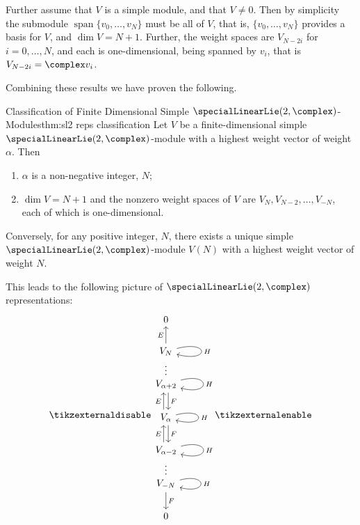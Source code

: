 \documentclass[fleqn]{NotesClass}
\DeclareMathOperator{\Span}{span}
\begin{document}
    Further assume that \(V\) is a simple module, and that \(V \ne 0\).
    Then by simplicity the submodule \(\Span\{v_0, \dotsc, v_N\}\) must be all of \(V\), that is, \(\{v_0, \dotsc, v_N\}\) provides a basis for \(V\), and \(\dim V = N + 1\).
    Further, the weight spaces are \(V_{N-2i}\) for \(i = 0, \dotsc, N\), and each is one-dimensional, being spanned by \(v_i\), that is \(V_{N - 2i} = \complex v_i\).
    
    Combining these results we have proven the following.
    
    \begin{thm}{Classification of Finite Dimensional Simple \(\specialLinearLie(2, \complex)\)-Modules}{thm:sl2 reps classification}
        Let \(V\) be a finite-dimensional simple \(\specialLinearLie(2, \complex)\)-module with a highest weight vector of weight \(\alpha\).
        Then
        \begin{enumerate}
            \item \(\alpha\) is a non-negative integer, \(N\);
            \item \(\dim V = N + 1\) and the nonzero weight spaces of \(V\) are \(V_N, V_{N-2}, \dotsc, V_{-N}\), each of which is one-dimensional.
        \end{enumerate}
        Conversely, for any positive integer, \(N\), there exists a unique simple \(\specialLinearLie(2, \complex)\)-module \(V(N)\) with a highest weight vector of weight \(N\).
    \end{thm}
    
    This leads to the following picture of \(\specialLinearLie(2, \complex)\) representations:
    \begin{equation}
        \label{eqn:sl2 rep picture}
        \hfil
        \tikzexternaldisable
        \begin{tikzcd}
            0 \\
            V_{N} \arrow[u, "E"] \arrow[d, phantom, "\vdots"] \arrow[loop right, looseness=15, "H"]\\
            V_{\alpha + 2} \arrow[d, shift left, "F"] \arrow[loop right, looseness=10, "H"]\\
            V_{\alpha} \arrow[d, shift left, "F"] \arrow[u, shift left, "E"] \arrow[loop right, looseness=15, "H"]\\
            V_{\alpha - 2} \arrow[u, shift left, "E"] \arrow[loop right, looseness=10, "H"]\\
            V_{-N} \arrow[d, "F"] \arrow[u, phantom, "\vdots"] \arrow[loop right, looseness=10, "H"]\\
            0
        \end{tikzcd}
        \tikzexternalenable
    \end{equation}
    
\end{document}
